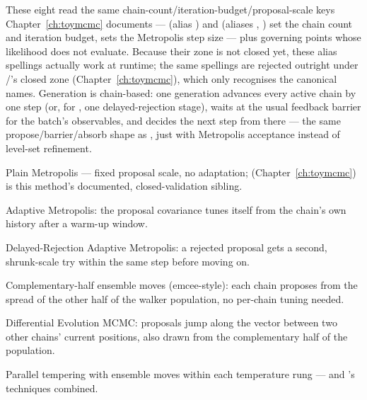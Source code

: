 These eight read the same chain-count/iteration-budget/proposal-scale keys
Chapter~\ref{ch:toymcmc} documents ---  (alias
) and  (aliases ,
) set the chain count and iteration budget, 
sets the Metropolis step size --- plus  governing points
whose likelihood does not evaluate. Because their  zone is not closed
yet, these alias spellings actually work at runtime; the same spellings are rejected
outright under /'s closed zone
(Chapter~\ref{ch:toymcmc}), which only recognises the canonical names. Generation is
chain-based: one generation advances
every active chain by one step (or, for , one delayed-rejection stage),
waits at the usual feedback barrier for the batch's observables, and decides the next
step from there --- the same propose/barrier/absorb shape as ,
just with Metropolis acceptance instead of level-set refinement.

\begin{description}[style=nextline, leftmargin=1.2em]
  \item[\sampler{MCMC}] Plain Metropolis --- fixed proposal scale, no adaptation;
         (Chapter~\ref{ch:toymcmc}) is this method's documented,
        closed-validation sibling.
  \item[\sampler{AMMCMC}, \sampler{AM}] Adaptive Metropolis: the proposal covariance
        tunes itself from the chain's own history after a warm-up window.
  \item[\sampler{DRAM}] Delayed-Rejection Adaptive Metropolis: a rejected proposal gets
        a second, shrunk-scale try within the same step before moving on.
  \item[\sampler{EnsembleMCMC} (alias \sampler{Ensemble})] Complementary-half ensemble
        moves (emcee-style): each chain proposes from the spread of the other half of
        the walker population, no per-chain tuning needed.
  \item[\sampler{DEMCMC}] Differential Evolution MCMC: proposals jump along the vector
        between two other chains' current positions, also drawn from the complementary
        half of the population.
  \item[\sampler{PTEnsemble}] Parallel tempering with ensemble moves within each
        temperature rung ---  and 's techniques
        combined.
\end{description}

